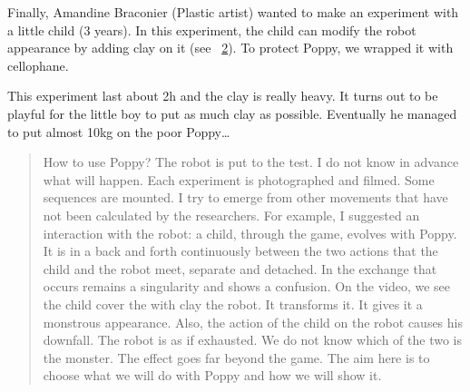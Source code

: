 \begin{figure}[tb]
\centering
    \hfil
    \caption{}
    \label{fig:}
\end{figure}

Finally, Amandine Braconier (Plastic artist) wanted to make an experiment with a little child (3 years). In this experiment, the child can modify the robot appearance by adding clay on it (see \figurename~\ref{fig:clay_on_poppy}). To protect Poppy, we wrapped it with cellophane.

\begin{figure}[tb]
\centering
    \hfil
    \caption{}
    \label{fig:clay_on_poppy}
\end{figure}

This experiment last about 2h and the clay is really heavy. It turns out to be playful for the little boy to put as much clay as possible. Eventually he managed to put almost 10kg on the poor Poppy\dots

\begin{quotation}
    How to use Poppy? The robot is put to the test. I do not know in advance what will happen. Each experiment is photographed and filmed. Some sequences are mounted. I try to emerge from other movements that have not been calculated by the researchers. For example, I suggested an interaction with the robot: a child, through the game, evolves with Poppy. It is in a back and forth continuously between the two actions that the child and the robot meet, separate and detached. In the exchange that occurs remains a singularity and shows a confusion. On the video, we see the child cover the with clay the robot. It transforms it. It gives it a monstrous appearance. Also, the action of the child on the robot causes his downfall. The robot is as if exhausted. We do not know which of the two is the monster. The effect goes far beyond the game. The aim here is to choose what we will do with Poppy and how we will show it.
\end{quotation}


